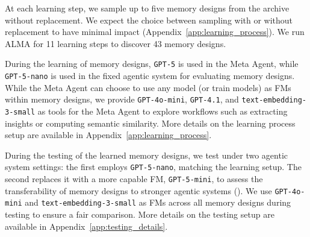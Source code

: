 \documentclass{article}
\theoremstyle{plain}
\theoremstyle{definition}
\theoremstyle{remark}
\newcommand{\ouralgo}{ALMA\xspace} %
\begin{document}
At each learning step, we sample up to five memory designs from the archive without replacement. We expect the choice between sampling with or without replacement to have minimal impact (Appendix~\ref{app:learning_process}).
We run \ouralgo for 11 learning steps to discover 43 memory designs.

During the learning of memory designs, \texttt{GPT-5} is used in the Meta Agent, while \texttt{GPT-5-nano} is used in the fixed agentic system for evaluating memory designs. While the Meta Agent can choose to use any model (or train models) as FMs within memory designs, we provide \texttt{GPT-4o-mini}, \texttt{GPT-4.1}, and \texttt{text-embedding-3-small} as tools for the Meta Agent to explore workflows such as extracting insights or computing semantic similarity. More details on the learning process setup are available in Appendix~\ref{app:learning_process}.

During the testing of the learned memory designs, we test under two agentic system settings: the first employs \texttt{GPT-5-nano}, matching the learning setup. The second replaces it with a more capable FM, \texttt{GPT-5-mini}, to assess the transferability of memory designs to stronger agentic systems (). We use \texttt{GPT-4o-mini} and \texttt{text-embedding-3-small} as FMs across all memory designs during testing to ensure a fair comparison. More details on the testing setup are available in Appendix~\ref{app:testing_details}.
\end{document}
